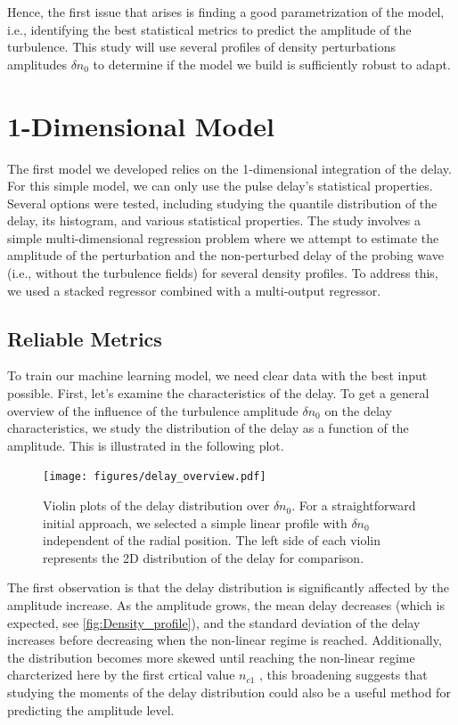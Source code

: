\documentclass[11pt,a4paper,openany]{report}
\begin{document}
\begin{multicols}{2}
    Hence, the first issue that arises is finding a good parametrization of the model, i.e., identifying the best statistical metrics to predict the amplitude of the turbulence. This study will use several profiles of density perturbations amplitudes $\delta n_0$ to determine if the model we build is sufficiently robust to adapt.

    \chapter{1-Dimensional Model}

    The first model we developed relies on the 1-dimensional integration of the delay. For this simple model, we can only use the pulse delay's statistical properties. Several options were tested, including studying the quantile distribution of the delay, its histogram, and various statistical properties. The study involves a simple multi-dimensional regression problem where we attempt to estimate the amplitude of the perturbation and the non-perturbed delay of the probing wave (i.e., without the turbulence fields) for several density profiles. To address this, we used a stacked regressor combined with a multi-output regressor.

    \section{Reliable Metrics}

    To train our machine learning model, we need clear data with the best input possible. First, let's examine the characteristics of the delay. To get a general overview of the influence of the turbulence amplitude $\delta n_0$ on the delay characteristics, we study the distribution of the delay as a function of the amplitude. This is illustrated in the following plot.

    \begin{figure}[H]
        \centering
        \texttt{[image: figures/delay\_overview.pdf]}
        \caption{Violin plots of the delay distribution over \(\delta n_0\). For a straightforward initial approach, we selected a simple linear profile with \(\delta n_0\) independent of the radial position. The left side of each violin represents the 2D distribution of the delay for comparison.}
        \label{fig:Violins_delay}
    \end{figure}
    The first observation is that the delay distribution is significantly affected by the amplitude increase. As the amplitude grows, the mean delay decreases (which is expected, see \ref{fig:Density_profile}), and the standard deviation of the delay increases before decreasing when the non-linear regime is reached. Additionally, the distribution becomes more skewed until reaching the non-linear regime charcterized here by the first crtical value $n_{c1}$ , this broadening suggests that studying the moments of the delay distribution could also be a useful method for predicting the amplitude level.


\end{multicols}
\end{document}
